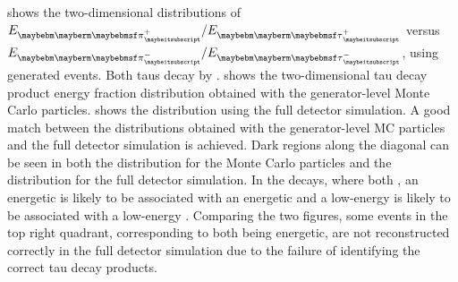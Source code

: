 


 shows the two-dimensional distributions of $E_{\Ppiplus} / E_{\APtauon}$ versus $E_{\Ppiminus} / E_{\Ptauon}$, using generated \eeZZQQ events. Both taus decay by \tauToPionBoth.  shows the  two-dimensional  tau decay product energy fraction distribution obtained with the generator-level  Monte Carlo particles.  shows the distribution using the full detector simulation. A good match between the distributions obtained with  the generator-level  MC particles and the full detector simulation is achieved. Dark regions along the diagonal can be seen in both the distribution for the Monte Carlo particles and the distribution for the full detector simulation. In the \ZToTauTau decays, where both \tauToPionBoth, an energetic \Pgppm is likely to be associated with an energetic \Pgpmp and a low-energy \Pgppm is  likely to be associated with a low-energy \Pgpmp. Comparing the two figures, some events in the top right quadrant, corresponding to  both \Ppipm being energetic, are not reconstructed correctly in the full detector simulation due to the failure of identifying the correct tau decay products.




